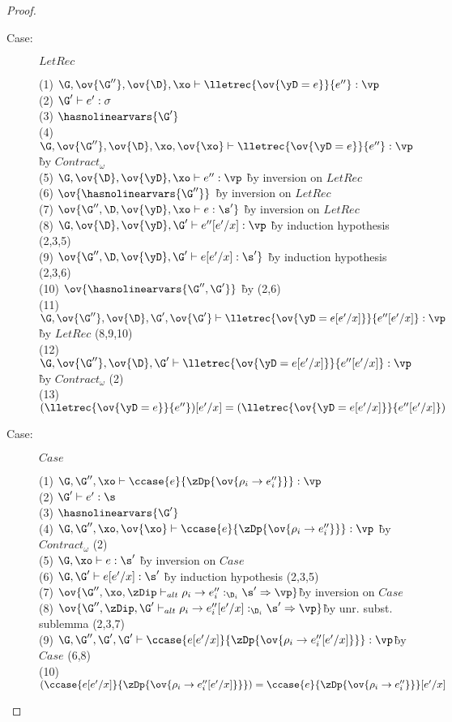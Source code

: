 \begin{proof}
\begin{description}
\item[Case:] $LetRec$
\begin{tabbing}
    (1) $\G, \ov{\G''}, \ov{\D}, \xo \vdash \lletrec{\ov{\yD = e}}{e''} : \vp$\\
    (2) $\G' \vdash e' : \sigma$\\
    (3) $\hasnolinearvars{\G'}$\\
    (4) $\G, \ov{\G''}, \ov{\D}, \xo, \ov{\xo} \vdash \lletrec{\ov{\yD = e}}{e''} : \vp$ \` by $Contract_\omega$\\
    (5) $\G, \ov{\D}, \ov{\yD}, \xo \vdash e'' : \vp$ \` by inversion on $LetRec$\\
    (6) $\ov{\hasnolinearvars{\G''}}$ \` by inversion on $LetRec$\\
    (7) $\ov{\G'', \D, \ov{\yD}, \xo \vdash e : \s'}$ \` by inversion on $LetRec$\\
    (8) $\G, \ov{\D}, \ov{\yD}, \G' \vdash e''[e'/x] : \vp$ \` by induction hypothesis (2,3,5)\\
    (9) $\ov{\G'', \D, \ov{\yD}, \G' \vdash e[e'/x] : \s'}$ \` by induction hypothesis (2,3,6)\\
    (10) $\ov{\hasnolinearvars{\G'',\G'}}$ \` by (2,6)\\
    (11) $\G, \ov{\G''}, \ov{\D}, \G', \ov{\G'} \vdash \lletrec{\ov{\yD = e[e'/x]}}{e''[e'/x]} : \vp$ \` by $LetRec$ (8,9,10)\\
    (12) $\G, \ov{\G''}, \ov{\D}, \G' \vdash \lletrec{\ov{\yD = e[e'/x]}}{e''[e'/x]} : \vp$ \` by $Contract_\omega$ (2)\\
    (13) $(\lletrec{\ov{\yD = e}}{e''})[e'/x] = (\lletrec{\ov{\yD = e[e'/x]}}{e''[e'/x]})$
\end{tabbing}

\item[Case:] $Case$
\begin{tabbing}
    (1) $\G, \G'', \xo \vdash \ccase{e}{\zDp \{\ov{\rho_i \to e''_i}\}} : \vp$\\
    (2) $\G' \vdash e' : \s$\\
    (3) $\hasnolinearvars{\G'}$\\
    (4) $\G, \G'', \xo, \ov{\xo} \vdash \ccase{e}{\zDp \{\ov{\rho_i \to
    e''_i}\}} : \vp$ \` by $Contract_\omega$ (2)\\
    (5) $\G, \xo \vdash e : \s'$ \` by inversion on $Case$\\
    (6) $\G, \G' \vdash e[e'/x] : \s'$ \` by induction hypothesis (2,3,5)\\
    (7) $\ov{\G'', \xo, \zDip \vdash_{alt} \rho_i \to e''_i :_{\D_i} \s' \Rightarrow \vp}$\` by inversion on $Case$\\
    (8) $\ov{\G'', \zDip, \G' \vdash_{alt} \rho_i \to e''_i[e'/x] :_{\D_i} \s' \Rightarrow \vp}$\` by unr. subst. sublemma (2,3,7)\\
    (9) $\G, \G'', \G', \G' \vdash \ccase{e[e'/x]}{\zDp \{\ov{\rho_i \to e''_i[e'/x]}\}} : \vp$\` by $Case$ (6,8)\\
    (10) $(\ccase{e[e'/x]}{\zDp \{\ov{\rho_i \to e''_i[e'/x]}\}}) = \ccase{e}{\zDp \{\ov{\rho_i \to e''_i}\}}[e'/x]$\\
\end{tabbing}
\end{description}


\end{proof}

